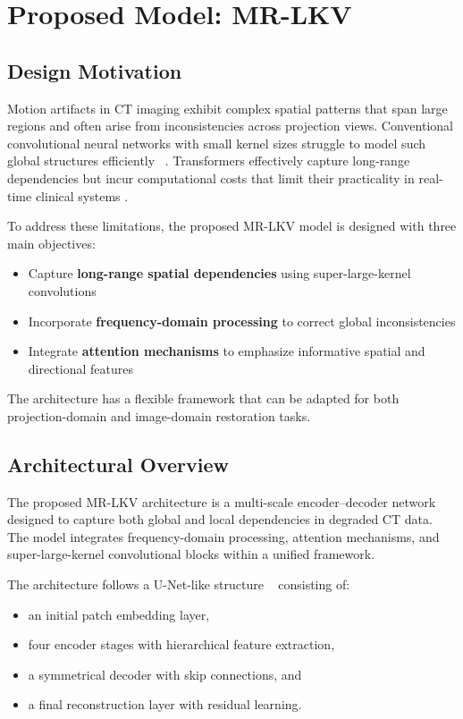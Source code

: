  \section{Proposed Model: MR-LKV}
 \subsection{Design Motivation}
Motion artifacts in CT imaging exhibit complex spatial patterns that span large regions and often arise from inconsistencies across projection views. Conventional convolutional neural networks with small kernel sizes struggle to model such global structures efficiently ~\cite{Luo2016}.  Transformers effectively capture long-range dependencies but incur computational costs that limit their practicality in real-time clinical systems \cite{restormer2022}.

To address these limitations, the proposed MR-LKV model is designed with three main objectives:

\begin{itemize}
    
    \item Capture \textbf{long-range spatial dependencies} using super-large-kernel convolutions 
    \item Incorporate \textbf{frequency-domain processing} to correct global inconsistencies 
    \item Integrate \textbf{attention mechanisms} to emphasize informative spatial and directional features


\end{itemize}

The architecture has a flexible framework that can be adapted for both projection-domain and image-domain restoration tasks. 
\subsection{Architectural Overview}

The proposed MR-LKV architecture is a multi-scale encoder--decoder network designed to capture both global and local dependencies in degraded CT data. The model integrates frequency-domain processing, attention mechanisms, and super-large-kernel convolutional blocks within a unified framework.

The architecture follows a U-Net-like structure ~\cite{ronneberger2015unet} consisting of:

\begin{itemize}
    \item an initial patch embedding layer,
    \item four encoder stages with hierarchical feature extraction,
    \item a symmetrical decoder with skip connections, and
    \item a final reconstruction layer with residual learning.
\end{itemize}

